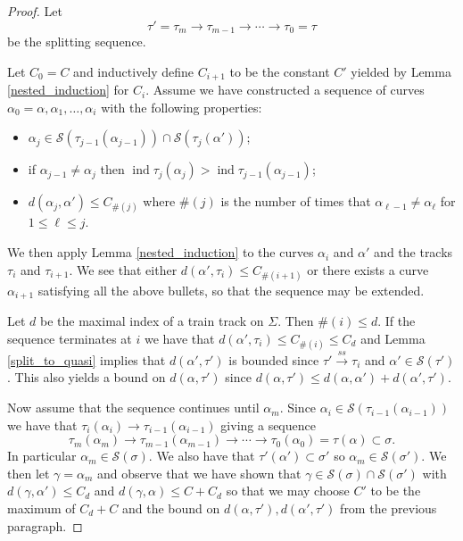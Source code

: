 \documentclass[11pt]{article}
\theoremstyle{remark}
\def\S{{\mathcal S}}
\def\ind{\operatorname{ind}}
\def\ss{{\overset{ss}\longrightarrow}}
\begin{document}
\begin{proof}

Let
$$\tau' = \tau_m \to \tau_{m-1} \to \cdots \to \tau_0 = \tau$$
be the splitting sequence. 

Let $C_0 = C$ and inductively define $C_{i+1}$ to be the constant $C'$ yielded by Lemma \ref{nested_induction} for $C_i$. Assume we have constructed a sequence of curves $\alpha_0= \alpha, \alpha_1, \dots, \alpha_i$ with the following properties:
\begin{itemize}
\item $\alpha_{j} \in \S(\tau_{j-1}(\alpha_{j-1})) \cap \S(\tau_{j}(\alpha'))$;

\item if $\alpha_{j-1} \neq \alpha_{j}$ then  $\ind{\tau_j}(\alpha_j) > \ind{\tau_{j-1}}(\alpha_{j-1})$;

\item $d(\alpha_j, \alpha') \le C_{\#(j)}$ where $\#(j)$ is the number of times that $\alpha_{\ell-1} \ne \alpha_\ell$ for $1\le \ell \le j$.
\end{itemize}
We then apply Lemma \ref{nested_induction} to the curves $\alpha_i$ and $\alpha'$ and the tracks $\tau_i$ and $\tau_{i+1}$. We see that either $d(\alpha', \tau_i) \le C_{\#(i+1)}$ or there exists a curve $\alpha_{i+1}$ satisfying all the above bullets, so that the sequence may be extended.

Let $d$ be the maximal index of a train track on $\Sigma$. Then $\#(i) \le d$. If the sequence terminates at $i$ we have that $d(\alpha', \tau_i) \le C_{\#(i)} \le C_d$ and Lemma \ref{split_to_quasi} implies that $d(\alpha', \tau')$ is bounded since $\tau' \ss \tau_i$ and $\alpha' \in \S(\tau')$. This also yields a bound on $d(\alpha,\tau')$ since $d(\alpha, \tau') \le d(\alpha, \alpha') + d(\alpha', \tau')$.


Now assume that the sequence continues until $\alpha_m$. Since $\alpha_i \in \S(\tau_{i-1}(\alpha_{i-1}))$ we have that $\tau_i(\alpha_i) \to \tau_{i-1}(\alpha_{i-1})$ giving a sequence
$$\tau_m(\alpha_m) \to \tau_{m-1}(\alpha_{m-1}) \to \cdots \to \tau_0(\alpha_0) = \tau(\alpha)\subset \sigma.$$
In particular $\alpha_m \in \S(\sigma)$. We also have that $\tau'(\alpha') \subset \sigma'$ so $\alpha_m \in \S(\sigma')$. We then let $\gamma = \alpha_m$ and observe that we have shown that $\gamma \in \S(\sigma) \cap \S(\sigma')$ with $d(\gamma, \alpha') \le C_d$ and $d(\gamma, \alpha) \le C + C_d$ so that we may choose $C'$ to be the maximum of $C_d + C$ and the bound on $d(\alpha,\tau'),d(\alpha',\tau')$ from the previous paragraph.
\end{proof}
\end{document}

